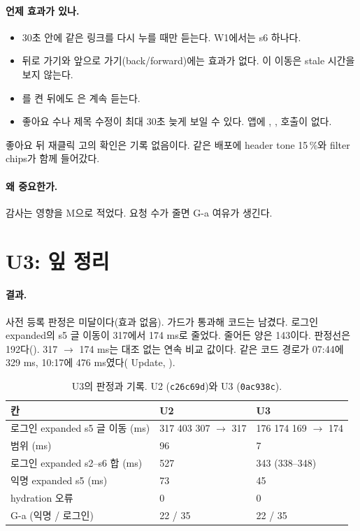 \paragraph{언제 효과가 있나.}
\begin{itemize}[nosep]
  \item 30초 안에 같은 링크를 다시 누를 때만 듣는다. W1에서는 s6 하나다.
  \item 뒤로 가기와 앞으로 가기(back/forward)에는 효과가 없다. 이 이동은 stale 시간을 보지 않는다.
  \item {}를 켠 뒤에도 은 계속 듣는다.
  \item 좋아요 수나 제목 수정이 최대 30초 늦게 보일 수 있다. 앱에 , ,  호출이 없다.
\end{itemize}
좋아요 뒤 재클릭 고의 확인은 기록 없음이다.
같은 배포에 header tone 15\,\%와 filter chips가 함께 들어갔다.

\paragraph{왜 중요한가.}
감사는 영향을 M으로 적었다. 요청 수가 줄면 G-a 여유가 생긴다.

\section{U3: 잎 정리}\label{sec:re-u3}

\paragraph{결과.}
사전 등록 판정은 미달이다(효과 없음). 가드가 통과해 코드는 남겼다.
로그인 expanded의 s5 글 이동이 317에서 174 ms로 줄었다. 줄어든 양은 143이다.
판정선은 192다().
317 $\to$ 174 ms는 대조 없는 연속 비교 값이다. 같은 코드 경로가 07:44에 329 ms, 10:17에 476 ms였다( Update, ).
\begin{table}[H]
  \caption{U3의 판정과 기록. U2 (\texttt{c26c69d})와 U3 (\texttt{0ac938c}).}
  \label{tab:re-u3}
  \centering\small
  \begin{tabularx}{\linewidth}{@{}Y L{2.8cm} L{2.8cm}@{}}
    \toprule
    칸 & U2 & U3 \\
    \midrule
    로그인 expanded s5 글 이동 (ms) & 317 403 307 $\to$ 317 & 176 174 169 $\to$ 174 \\
    \midrule
    범위 (ms) & 96 & 7 \\
    \midrule
    로그인 expanded s2--s6 합 (ms) & 527 & 343 (338--348) \\
    \midrule
    익명 expanded s5 (ms) & 73 & 45 \\
    \midrule
    hydration 오류 & 0 & 0 \\
    \midrule
    G-a (익명 / 로그인) & 22 / 35 & 22 / 35 \\
    \bottomrule
  \end{tabularx}
\end{table}

